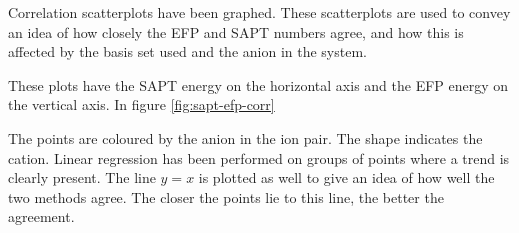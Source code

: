 

Correlation scatterplots have been graphed.
These scatterplots are used to convey an idea of how closely the EFP and SAPT numbers agree, and how this is affected by the basis set used and the anion in the system.


These plots have the SAPT energy on the horizontal axis and the EFP energy on the vertical axis. 
In figure 
\ref{fig:sapt-efp-corr}

The points are coloured by the anion in the ion pair.
The shape indicates the cation.
Linear regression has been performed on groups of points where a trend is clearly present.
The line $ y = x $ is plotted as well to give an idea of how well the two methods agree.
The closer the points lie to this line, the better the agreement. 

